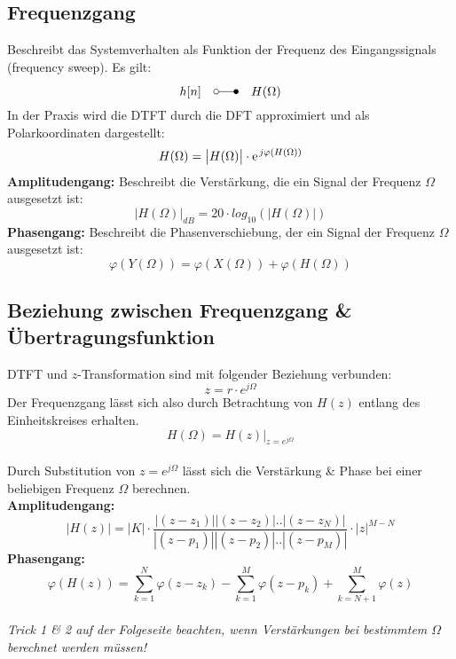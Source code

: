 \subsection{Frequenzgang}
Beschreibt das Systemverhalten als Funktion der Frequenz des Eingangssignals (frequency sweep). Es gilt: 
\[ h[n] \quad \laplace \quad H(\Omega) \]
In der Praxis wird die DTFT durch die DFT approximiert und als Polarkoordinaten dargestellt: 
\[ H(\Omega) = \big|H(\Omega) \big| \cdot \e^{j\varphi(H(\Omega))} \]	
\textbf{Amplitudengang:} Beschreibt die Verstärkung, die ein Signal der Frequenz $\Omega$ ausgesetzt ist:
\[ \big|H(\Omega)\big|_{dB} = 20 \cdot log_{10}(\big|H(\Omega)\big|) \]	
\textbf{Phasengang:} Beschreibt die Phasenverschiebung, der ein Signal der Frequenz $\Omega$ ausgesetzt ist:
\[ \varphi(Y(\Omega)) = \varphi(X(\Omega)) + \varphi(H(\Omega))\]	
\subsection{Beziehung zwischen Frequenzgang \& Übertragungsfunktion}
DTFT und $z$-Transformation sind mit folgender Beziehung verbunden:
\[ z = r \cdot e^{j\Omega} \]
Der Frequenzgang lässt sich also durch Betrachtung von $H(z)$ entlang des Einheitskreises erhalten.
\[ H(\Omega) = H(z)\big|_{z=e^{j\Omega}} \]	
\\
Durch Substitution von $z=e^{j\Omega}$ lässt sich  die Verstärkung \& Phase bei einer 
beliebigen Frequenz $\Omega$ berechnen.\\ 
\textbf{Amplitudengang:}
\[ \big| H(z)\big| =  |K| \cdot \frac{|(z-z_1)||(z-z_2)|..|(z-z_N)|}
								{|(z-p_1)||(z-p_2)|..|(z-p_M)|}
								\cdot |z|^{M-N} \]
\textbf{Phasengang:}
\[ \varphi(H(z)) = \sum_{k=1}^{N} \varphi(z-z_k) 
								-\sum_{k=1}^{M} \varphi(z-p_k)
								+\sum_{k=N+1}^{M} \varphi(z)  \]
~\\						
\emph{Trick 1 \& 2 auf der Folgeseite beachten, wenn Verstärkungen bei bestimmtem $\Omega$ berechnet werden müssen!}
